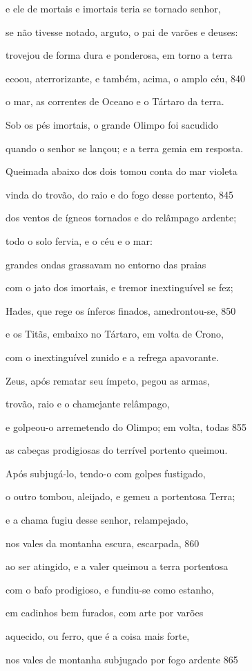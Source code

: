 e ele de mortais e imortais teria se tornado senhor,

se não tivesse notado, arguto, o pai de varões e deuses:

trovejou de forma dura e ponderosa, em torno a terra

ecoou, aterrorizante, e também, acima, o amplo céu, \num{840}

o mar, as correntes de Oceano e o Tártaro da terra.

Sob os pés imortais, o grande Olimpo foi sacudido

quando o senhor se lançou; e a terra gemia em resposta.

Queimada abaixo dos dois tomou conta do mar violeta

vinda do trovão, do raio e do fogo desse portento, \num{845}

dos ventos de ígneos tornados e do relâmpago ardente;

todo o solo fervia, e o céu e o mar:

grandes ondas grassavam no entorno das praias

com o jato dos imortais, e tremor inextinguível se fez;

Hades, que rege os ínferos finados, amedrontou-se, \num{850}

e os Titãs, embaixo no Tártaro, em volta de Crono,

com o inextinguível zunido e a refrega apavorante.

\quad{}Zeus, após rematar seu ímpeto, pegou as armas,

trovão, raio e o chamejante relâmpago,

e golpeou-o arremetendo do Olimpo; em volta, todas \num{855}

as cabeças prodigiosas do terrível portento queimou.

Após subjugá-lo, tendo-o com golpes fustigado,

o outro tombou, aleijado, e gemeu a portentosa Terra;

e a chama fugiu desse senhor, relampejado,

nos vales da montanha escura, escarpada, \num{860}

ao ser atingido, e a valer queimou a terra portentosa

com o bafo prodigioso, e fundiu-se como estanho,

em cadinhos bem furados, com arte por varões

aquecido, ou ferro, que é a coisa mais forte,

nos vales de montanha subjugado por fogo ardente \num{865}


